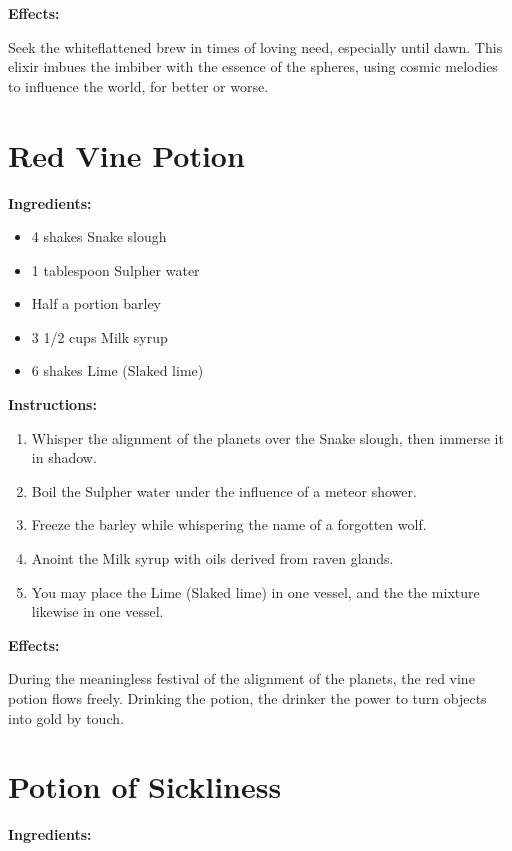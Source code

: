 \documentclass{article}
\begin{document}
\textbf{Effects:}

Seek the whiteflattened brew in times of loving need, especially until dawn. This elixir imbues the imbiber with the essence of the spheres, using cosmic melodies to influence the world, for better or worse.

\newpage
\section*{Red Vine Potion}

\textbf{Ingredients:}

\begin{itemize}
  \item 4 shakes Snake slough
  \item 1 tablespoon Sulpher water
  \item Half a portion barley
  \item 3 1/2 cups Milk syrup
  \item 6 shakes Lime (Slaked lime)
\end{itemize}

\textbf{Instructions:}

\begin{enumerate}
  \item Whisper the alignment of the planets over the Snake slough, then immerse it in shadow.
  \item Boil the Sulpher water under the influence of a meteor shower.
  \item Freeze the barley while whispering the name of a forgotten wolf.
  \item Anoint the Milk syrup with oils derived from raven glands.
  \item You may place the Lime (Slaked lime) in one vessel, and the the mixture likewise in one vessel.
\end{enumerate}

\textbf{Effects:}

During the meaningless festival of the alignment of the planets, the red vine potion flows freely. Drinking the potion, the drinker the power to turn objects into gold by touch.

\newpage
\section*{Potion of Sickliness}

\textbf{Ingredients:}
\end{document}
